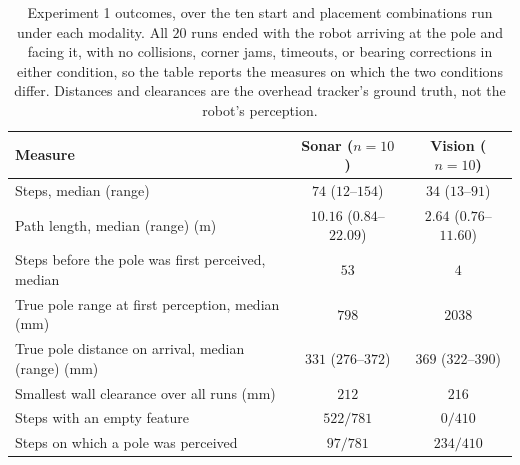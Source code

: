 \documentclass[11pt]{article}
\begin{document}
\begin{table}[ht]
\centering
\caption{Experiment 1 outcomes, over the ten start and placement combinations run under each modality. All $20$ runs ended with the robot arriving at the pole and facing it, with no collisions, corner jams, timeouts, or bearing corrections in either condition, so the table reports the measures on which the two conditions differ. Distances and clearances are the overhead tracker's ground truth, not the robot's perception.}
\label{tab:direct-results}
\begin{tabular}{lcc}
\hline
\textbf{Measure} & \textbf{Sonar} ($n=10$) & \textbf{Vision} ($n=10$) \\
\hline
Steps, median (range)                       & $74$ ($12$--$154$) & $34$ ($13$--$91$) \\
Path length, median (range) (m)             & $10.16$ ($0.84$--$22.09$) & $2.64$ ($0.76$--$11.60$) \\
Steps before the pole was first perceived, median & $53$ & $4$ \\
True pole range at first perception, median (mm)  & $798$ & $2038$ \\
True pole distance on arrival, median (range) (mm) & $331$ ($276$--$372$) & $369$ ($322$--$390$) \\
Smallest wall clearance over all runs (mm)  & $212$ & $216$ \\
Steps with an empty feature                 & $522 / 781$ & $0 / 410$ \\
Steps on which a pole was perceived         & $97 / 781$ & $234 / 410$ \\
\hline
\end{tabular}
\end{table}
\end{document}
